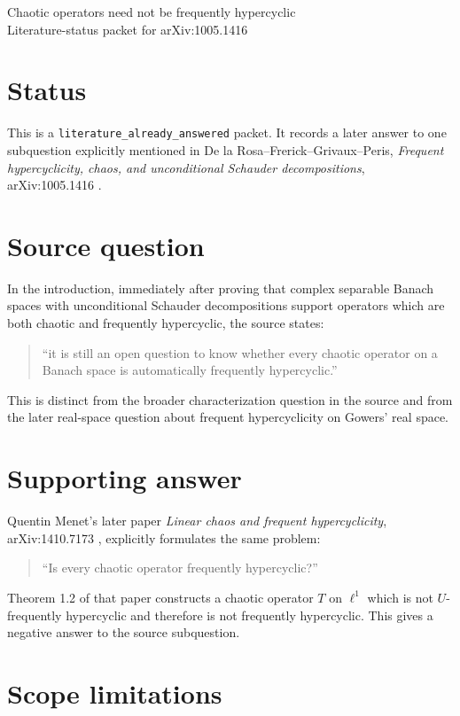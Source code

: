 \documentclass[11pt]{article}
\begin{document}
\begin{center}
{\Large Chaotic operators need not be frequently hypercyclic}\\[4pt]
{\normalsize Literature-status packet for arXiv:1005.1416}
\end{center}

\section*{Status}

This is a \texttt{literature\_already\_answered} packet.  It records a later
answer to one subquestion explicitly mentioned in De la Rosa--Frerick--Grivaux--Peris,
\emph{Frequent hypercyclicity, chaos, and unconditional Schauder
decompositions}, arXiv:1005.1416 \cite{DFGP}.

\section*{Source question}

In the introduction, immediately after proving that complex separable Banach
spaces with unconditional Schauder decompositions support operators which are
both chaotic and frequently hypercyclic, the source states:
\begin{quote}
``it is still an open question to know whether every chaotic operator on a
Banach space is automatically frequently hypercyclic.''
\end{quote}
This is distinct from the broader characterization question in the source and
from the later real-space question about frequent hypercyclicity on Gowers'
real space.

\section*{Supporting answer}

Quentin Menet's later paper \emph{Linear chaos and frequent hypercyclicity},
arXiv:1410.7173 \cite{Menet}, explicitly formulates the same problem:
\begin{quote}
``Is every chaotic operator frequently hypercyclic?''
\end{quote}
Theorem 1.2 of that paper constructs a chaotic operator \(T\) on
\(\ell^1\) which is not \(U\)-frequently hypercyclic and therefore is not
frequently hypercyclic.  This gives a negative answer to the source
subquestion.

\section*{Scope limitations}
\end{document}
